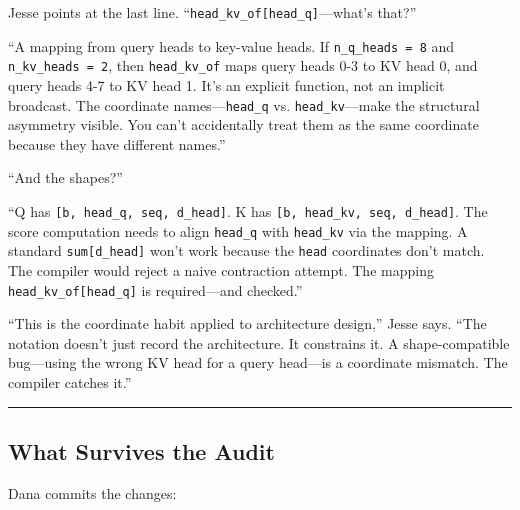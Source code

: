 \documentclass[11pt,]{article}
\begin{document}
Jesse points at the last line.
``\texttt{head\_kv\_of{[}head\_q{]}}---what's that?''

``A mapping from query heads to key-value heads. If
\texttt{n\_q\_heads\ =\ 8} and \texttt{n\_kv\_heads\ =\ 2}, then
\texttt{head\_kv\_of} maps query heads 0-3 to KV head 0, and query heads
4-7 to KV head 1. It's an explicit function, not an implicit broadcast.
The coordinate names---\texttt{head\_q} vs. \texttt{head\_kv}---make the
structural asymmetry visible. You can't accidentally treat them as the
same coordinate because they have different names.''

``And the shapes?''

``Q has \texttt{{[}b,\ head\_q,\ seq,\ d\_head{]}}. K has
\texttt{{[}b,\ head\_kv,\ seq,\ d\_head{]}}. The score computation needs
to align \texttt{head\_q} with \texttt{head\_kv} via the mapping. A
standard \texttt{sum{[}d\_head{]}} won't work because the \texttt{head}
coordinates don't match. The compiler would reject a naive contraction
attempt. The mapping \texttt{head\_kv\_of{[}head\_q{]}} is
required---and checked.''

``This is the coordinate habit applied to architecture design,'' Jesse
says. ``The notation doesn't just record the architecture. It constrains
it. A shape-compatible bug---using the wrong KV head for a query
head---is a coordinate mismatch. The compiler catches it.''

\begin{center}\rule{0.5\linewidth}{0.4pt}\end{center}

\hypertarget{what-survives-the-audit}{%
\subsection{What Survives the Audit}\label{what-survives-the-audit}}

Dana commits the changes:
\end{document}
